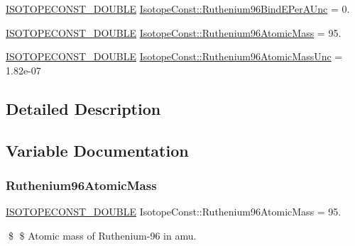 \begin{DoxyCompactItemize}
\mbox{\hyperlink{group___isotope_const-_macros_ga8f45a7272ce02c0b4c65c44636ed719a}{I\+S\+O\+T\+O\+P\+E\+C\+O\+N\+S\+T\+\_\+\+D\+O\+U\+B\+LE}} \mbox{\hyperlink{group___isotope_const-_ruthenium-_ru96_ga92a7f154d09285a2a06eb17c4c7b64d5}{Isotope\+Const\+::\+Ruthenium96\+Bind\+E\+Per\+A\+Unc}} = 0.
\item 
\mbox{\hyperlink{group___isotope_const-_macros_ga8f45a7272ce02c0b4c65c44636ed719a}{I\+S\+O\+T\+O\+P\+E\+C\+O\+N\+S\+T\+\_\+\+D\+O\+U\+B\+LE}} \mbox{\hyperlink{group___isotope_const-_ruthenium-_ru96_ga6bcc39f52dfb289979fc6616faa1c1a6}{Isotope\+Const\+::\+Ruthenium96\+Atomic\+Mass}} = 95.
\item 
\mbox{\hyperlink{group___isotope_const-_macros_ga8f45a7272ce02c0b4c65c44636ed719a}{I\+S\+O\+T\+O\+P\+E\+C\+O\+N\+S\+T\+\_\+\+D\+O\+U\+B\+LE}} \mbox{\hyperlink{group___isotope_const-_ruthenium-_ru96_ga5dd6e2a6e40c304f953830e3cab8bbc4}{Isotope\+Const\+::\+Ruthenium96\+Atomic\+Mass\+Unc}} = 1.\+82e-\/07
\end{DoxyCompactItemize}


\subsection{Detailed Description}


\subsection{Variable Documentation}
\mbox{\label{group___isotope_const-_ruthenium-_ru96_ga6bcc39f52dfb289979fc6616faa1c1a6}} 
\subsubsection{\texorpdfstring{Ruthenium96\+Atomic\+Mass}{Ruthenium96AtomicMass}}
{\footnotesize\ttfamily \mbox{\hyperlink{group___isotope_const-_macros_ga8f45a7272ce02c0b4c65c44636ed719a}{I\+S\+O\+T\+O\+P\+E\+C\+O\+N\+S\+T\+\_\+\+D\+O\+U\+B\+LE}} Isotope\+Const\+::\+Ruthenium96\+Atomic\+Mass = 95.}

\$ \$ Atomic mass of Ruthenium-\/96 in amu. \mbox{\label{group___isotope_const-_ruthenium-_ru96_ga5dd6e2a6e40c304f953830e3cab8bbc4}} 
